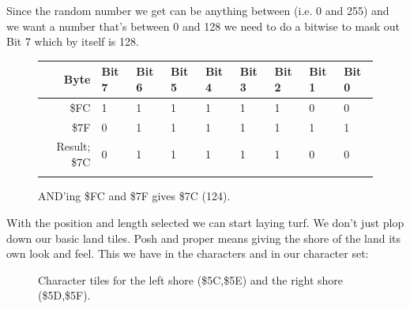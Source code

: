 Since the random number we get can be anything between  (i.e. 0 and 255) and we want a number
that's between 0 and 128 we need to do a bitwise  to mask out Bit 7 which by itself is 128.

\begin{figure}[H]
  {
    \setlength{\tabcolsep}{3.0pt}
    \setlength\cmidrulewidth{\heavyrulewidth} %
    \begin{adjustbox}{width=10cm,center}

      \begin{tabular}{rllllllll}
        \toprule
        Byte & Bit 7 & Bit 6 & Bit 5 & Bit 4 & Bit 3 & Bit 2 & Bit 1 & Bit 0        \\
        \midrule
        \$FC & 1 & 1 & 1 & 1 & 1 & 1 & 0 & 0 \\
        \$7F & 0 & 1 & 1 & 1 & 1 & 1 & 1 & 1 \\
        \midrule
        Result; \$7C & 0 & 1 & 1 & 1 & 1 & 1 & 0 & 0 \\
        \addlinespace
        \bottomrule
      \end{tabular}

    \end{adjustbox}

  }\caption*{AND'ing \$FC and \$7F gives \$7C (124).}
\end{figure}

With the position and length selected we can start laying turf. We don't just plop down our basic land tiles. Posh
and proper means giving the shore of the land its own look and feel. This we have in the characters  and
 in our character set: 

\begin{figure}[H]
{
  \setlength{\tabcolsep}{3.0pt}
  \setlength\cmidrulewidth{\heavyrulewidth} %
    \begin{adjustbox}{width=15cm,center}
  \begin{subfigure}{0.3\textwidth}
  
  \end{subfigure}
  \begin{subfigure}{0.3\textwidth}
  
  \end{subfigure}
  \begin{subfigure}{0.3\textwidth}
  
  \end{subfigure}
  \begin{subfigure}{0.3\textwidth}
  
  \end{subfigure}
  \end{adjustbox}
}\caption[]{Character tiles for the left shore (\$5C,\$5E) and the right shore (\$5D,\$5F).}
\end{figure}


